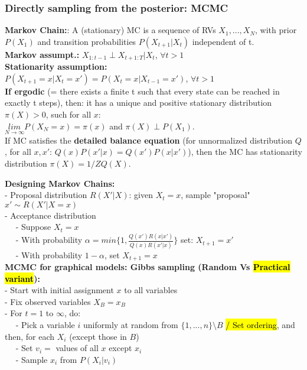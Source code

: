 \subsubsection{Directly sampling from the posterior: MCMC}
\textbf{Markov Chain:}: A (stationary) MC is a sequence of RVs $X_1, ..., X_N$, with prior $P(X_1)$ and transition probabilities $P(X_{t+1}|X_t)$ independent of t.\\
\textbf{Markov assumpt.:} $X_{1:t-1}\perp X_{t+1:T}|X_t$, $\forall t>1$\\
\textbf{Stationarity assumption:}\\
$P(X_{t+1}=x|X_t=x')=P(X_{t}=x|X_{t-1}=x')$, $\forall t>1$\\
\textbf{If ergodic} (= there exists a finite t such that every state can be reached in exactly t steps), then: it has a unique and positive stationary distribution $\pi(X)>0$, such for all $x$:\\
            $\underset{N\rightarrow\infty}{lim}P(X_N=x)=\pi(x)$ and $\pi(X)\perp P(X_1)$.\\
If MC satisfies the \textbf{detailed balance equation} (for unnormalized distribution $Q$, for all $x,x'$: $Q(x)P(x'|x)=Q(x')P(x|x')$), then the MC has stationarity distribution $\pi(X)=1/ZQ(X)$.

\textbf{Designing Markov Chains:}\\
- Proposal distribution $R(X'|X)$: given $X_t=x$, sample "proposal" $x'\sim R(X'|X=x)$\\
- Acceptance distribution\\
$\quad$ - Suppose $X_t=x$\\
$\quad$ - With probability $\alpha=min \Big\{1, \frac{Q(x')R(x|x')}{Q(x)R(x'|x)}\Big\}$
        set: $X_{t+1}=x'$\\
$\quad$ - With probability $1-\alpha$, set $X_{t+1}=x$\\

\textbf{MCMC for graphical models: Gibbs sampling (Random Vs \hl{Practical variant}):}\\
- Start with initial assignment $x$ to all variables\\
- Fix observed variables $X_B=x_B$\\
- For $t=1$ to $\infty$, do:\\
$\quad$ - Pick a variable $i$ uniformly at random from $\{1,...,n\}\setminus B$ \hl{/ Set ordering}, and then, for each $X_i$ (except those in $B$)\\
$\quad$ - Set $v_i=$ values of all $x$ except $x_i$\\
$\quad$ - Sample $x_i$ from $P(X_i|v_i)$
\fi



